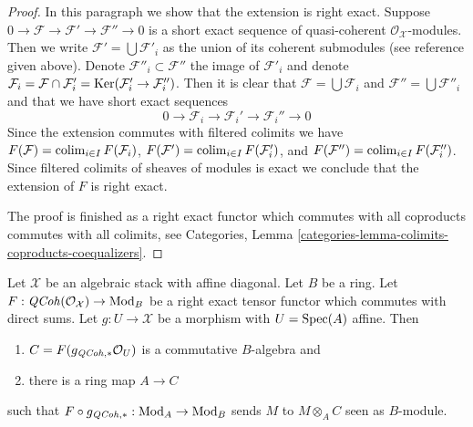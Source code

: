 \begin{proof}
\medskip\noindent
In this paragraph we show that the extension is right exact.
Suppose $0 \to \mathcal{F} \to \mathcal{F}' \to \mathcal{F}'' \to 0$
is a short exact sequence of quasi-coherent $\mathcal{O}_\mathcal{X}$-modules.
Then we write $\mathcal{F}' = \bigcup \mathcal{F}'_i$ as the
union of its coherent submodules (see reference given above).
Denote $\mathcal{F}''_i \subset \mathcal{F}''$ the image of $\mathcal{F}'_i$
and denote $\mathcal{F}_i = \mathcal{F} \cap \mathcal{F}'_i =
\mathop{\mathrm{Ker}}(\mathcal{F}'_i \to \mathcal{F}''_i)$. Then it is clear that
$\mathcal{F} = \bigcup \mathcal{F}_i$ and
$\mathcal{F}'' = \bigcup \mathcal{F}''_i$
and that we have short exact sequences
$$
0 \to \mathcal{F}_i \to \mathcal{F}_i' \to \mathcal{F}_i'' \to 0
$$
Since the extension commutes with filtered colimits we have
$F(\mathcal{F}) = \mathop{\mathrm{colim}}\nolimits_{i \in I} F(\mathcal{F}_i)$,
$F(\mathcal{F}') = \mathop{\mathrm{colim}}\nolimits_{i \in I} F(\mathcal{F}'_i)$, and
$F(\mathcal{F}'') = \mathop{\mathrm{colim}}\nolimits_{i \in I} F(\mathcal{F}''_i)$.
Since filtered colimits of sheaves of modules is exact we
conclude that the extension of $F$ is right exact.

\medskip\noindent
The proof is finished as a right exact functor which commutes with all
coproducts commutes with all colimits, see
Categories, Lemma \ref{categories-lemma-colimits-coproducts-coequalizers}.
\end{proof}

\begin{lemma}
\label{lemma-affine}
Let $\mathcal{X}$ be an algebraic stack with affine diagonal.
Let $B$ be a ring. Let $F : \mathit{QCoh}(\mathcal{O}_\mathcal{X}) \to \text{Mod}_B$
be a right exact tensor functor which commutes with direct sums.
Let $g : U \to \mathcal{X}$ be a morphism with $U = \mathop{\mathrm{Spec}}(A)$ affine. Then
\begin{enumerate}
\item $C = F(g_{\mathit{QCoh}, *}\mathcal{O}_U)$ is a commutative $B$-algebra and
\item there is a ring map $A \to C$
\end{enumerate}
such that $F \circ g_{\mathit{QCoh}, *} : \text{Mod}_A \to \text{Mod}_B$
sends $M$ to $M \otimes_A C$ seen as $B$-module.
\end{lemma}

